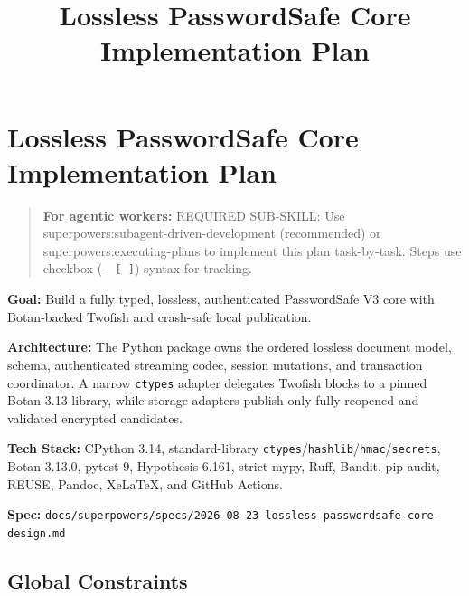 \documentclass[
  letterpaper,
]{article}
\title{Lossless PasswordSafe Core Implementation Plan}
\author{}
\date{}
\newcommand{\passthrough}[1]{#1}
\begin{document}
\maketitle

{
\setcounter{tocdepth}{3}
\tableofcontents
}
\section{Lossless PasswordSafe Core Implementation Plan}\label{lossless-passwordsafe-core-implementation-plan}

\begin{quote}
\textbf{For agentic workers:} REQUIRED SUB-SKILL: Use superpowers:subagent-driven-development (recommended) or
superpowers:executing-plans to implement this plan task-by-task. Steps use checkbox (\passthrough{\lstinline!- [ ]!})
syntax for tracking.
\end{quote}

\textbf{Goal:} Build a fully typed, lossless, authenticated PasswordSafe V3 core with Botan-backed Twofish and
crash-safe local publication.

\textbf{Architecture:} The Python package owns the ordered lossless document model, schema, authenticated streaming
codec, session mutations, and transaction coordinator. A narrow \passthrough{\lstinline!ctypes!} adapter delegates
Twofish blocks to a pinned Botan 3.13 library, while storage adapters publish only fully reopened and validated
encrypted candidates.

\textbf{Tech Stack:} CPython 3.14, standard-library
\passthrough{\lstinline!ctypes!}/\passthrough{\lstinline!hashlib!}/\passthrough{\lstinline!hmac!}/\passthrough{\lstinline!secrets!},
Botan 3.13.0, pytest 9, Hypothesis 6.161, strict mypy, Ruff, Bandit, pip-audit, REUSE, Pandoc, XeLaTeX, and GitHub
Actions.

\textbf{Spec:} \nolinkurl{docs/superpowers/specs/2026-08-23-lossless-passwordsafe-core-design.md}

\subsection{Global Constraints}\label{global-constraints}
\end{document}

